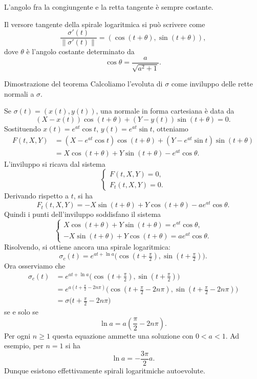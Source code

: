 \documentclass[a4paper]{article}
\begin{document}
L'angolo fra la congiungente e la retta tangente è sempre costante.

\begin{snippetcorollary}{}
Il versore tangente della spirale logaritmica si può scrivere come
\[
     \frac{\sigma'(t)}{\|\sigma'(t)\|}=(\cos(t+\theta),\sin(t+\theta)),
\]
dove \(\theta\) è l'angolo costante determinato da
\[
     \cos\theta=\frac{a}{\sqrt{a^2+1}}.
\]
\end{snippetcorollary}

\begin{snippetproof}{Dimostrazione del teorema}
Calcoliamo l'evoluta di \(\sigma\) come inviluppo delle rette normali a \(\sigma\).

Se \(\sigma(t)=(x(t),y(t))\), una normale in forma cartesiana è data da
\[
     (X-x(t))\cos(t+\theta)+(Y-y(t))\sin(t+\theta)=0.
\]
Sostituendo \(x(t)=e^{at}\cos t\), \(y(t)=e^{at}\sin t\), otteniamo
\begin{align*}
     F(t,X,Y)
     &= (X-e^{at}\cos t)\cos(t+\theta)+(Y-e^{at}\sin t)\sin(t+\theta) \\
     &= X\cos(t+\theta)+Y\sin(t+\theta)-e^{at}\cos\theta.
\end{align*}
L'inviluppo si ricava dal sistema
\[
     \begin{cases}
         F(t,X,Y)=0,\\
         F_t(t,X,Y)=0.
     \end{cases}
\]
Derivando rispetto a \(t\), si ha
\[
     F_t(t,X,Y)=-X\sin(t+\theta)+Y\cos(t+\theta)-ae^{at}\cos\theta.
\]
Quindi i punti dell'inviluppo soddisfano il sistema
\[
     \begin{cases}
         X\cos(t+\theta)+Y\sin(t+\theta)=e^{at}\cos\theta,\\
         -X\sin(t+\theta)+Y\cos(t+\theta)=ae^{at}\cos\theta.
     \end{cases}
\]
Risolvendo, si ottiene ancora una spirale logaritmica:
\[
     \sigma_c(t)=e^{at+\ln a}\bigl(\cos(t+\tfrac{\pi}{2}),\sin(t+\tfrac{\pi}{2})\bigr).
\]
Ora osserviamo che
\begin{align*}
     \sigma_c(t)
     &= e^{at+\ln a}\bigl(\cos(t+\tfrac{\pi}{2}),\sin(t+\tfrac{\pi}{2})\bigr) \\
     &= e^{a(t+\frac{\pi}{2}-2n\pi)}\bigl(\cos(t+\tfrac{\pi}{2}-2n\pi),\sin(t+\tfrac{\pi}{2}-2n\pi)\bigr) \\
     &= \sigma\bigl(t+\tfrac{\pi}{2}-2n\pi\bigr)
\end{align*}
se e solo se
\[
     \ln a = a\left(\frac{\pi}{2}-2n\pi\right).
\]
Per ogni \(n\geq 1\) questa equazione ammette una soluzione con \(0<a<1\). Ad esempio, per \(n=1\) si ha
\[
     \ln a=-\frac{3\pi}{2}a.
\]
Dunque esistono effettivamente spirali logaritmiche autoevolute.
\end{snippetproof}
\end{document}
